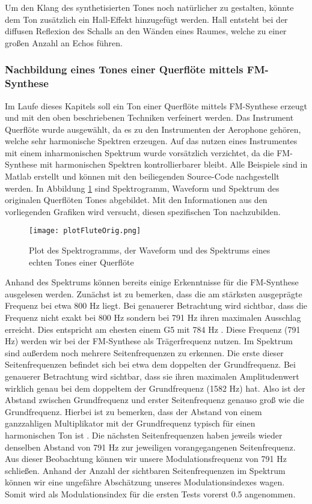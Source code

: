 Um den Klang des synthetisierten Tones noch natürlicher zu gestalten, könnte dem Ton zusätzlich ein Hall-Effekt hinzugefügt werden. Hall entsteht bei der diffusen Reflexion des Schalls an den Wänden eines Raumes, welche zu einer großen Anzahl an Echos führen. \cite[S. 108]{stotz}


\FloatBarrier
\subsubsection{Nachbildung eines Tones einer Querflöte mittels FM-Synthese}

Im Laufe dieses Kapitels soll ein Ton einer Querflöte mittels FM-Synthese erzeugt und mit den oben beschriebenen Techniken verfeinert werden. Das Instrument Querflöte wurde ausgewählt, da es zu den Instrumenten der Aerophone gehören, welche sehr harmonische Spektren erzeugen. \cite[S. TODO]{barkowsky} Auf das nutzen eines Instrumentes mit einem inharmonischen Spektrum wurde vorsätzlich verzichtet, da die FM-Synthese mit harmonischen Spektren kontrollierbarer bleibt. Alle Beispiele sind in Matlab erstellt und können mit den beiliegenden Source-Code nachgestellt werden. In Abbildung \ref{fig:plotFluteOrig} sind Spektrogramm, Waveform und Spektrum des originalen Querflöten Tones abgebildet. Mit den Informationen aus den vorliegenden Grafiken wird versucht, diesen spezifischen Ton nachzubilden.

\begin{figure} [h!t!b!]
\centering
  \texttt{[image: plotFluteOrig.png]}
\caption{Plot des Spektrogramms, der Waveform und des Spektrums eines echten Tones einer Querflöte}
\label{fig:plotFluteOrig}
\end{figure}

Anhand des Spektrums können bereits einige Erkenntnisse für die FM-Synthese ausgelesen werden. Zunächst ist zu bemerken, dass die am stärksten ausgeprägte Frequenz bei etwa 800 Hz liegt. Bei genauerer Betrachtung wird sichtbar, dass die Frequenz nicht exakt bei 800 Hz sondern bei 791 Hz ihren maximalen Ausschlag erreicht. Dies entspricht am ehesten einem G5 mit 784 Hz \cite[S. 181]{borucki}. Diese Frequenz (791 Hz) werden wir bei der FM-Synthese als Trägerfrequenz nutzen. Im Spektrum sind außerdem noch mehrere Seitenfrequenzen zu erkennen. Die erste dieser Seitenfrequenzen befindet sich bei etwa dem doppelten der Grundfrequenz. Bei genauerer Betrachtung wird sichtbar, dass sie ihren maximalen Amplitudenwert wirklich genau bei dem doppeltem der Grundfrequenz (1582 Hz) hat. Also ist der Abstand zwischen Grundfrequenz und erster Seitenfrequenz genauso groß wie die Grundfrequenz. Hierbei ist zu bemerken, dass der Abstand von einem ganzzahligen Multiplikator mit der Grundfrequenz typisch für einen harmonischen Ton ist \cite[S. 528]{chowningPaper}. Die nächsten Seitenfrequenzen haben jeweils wieder denselben Abstand von 791 Hz zur jeweiligen vorangegangenen Seitenfrequenz. Aus dieser Beobachtung können wir unsere Modulationsfrequenz von 791 Hz schließen. Anhand der Anzahl der sichtbaren Seitenfrequenzen im Spektrum können wir eine ungefähre Abschätzung unseres Modulationsindexes wagen. Somit wird als Modulationsindex für die ersten Tests vorerst 0.5 angenommen. 

